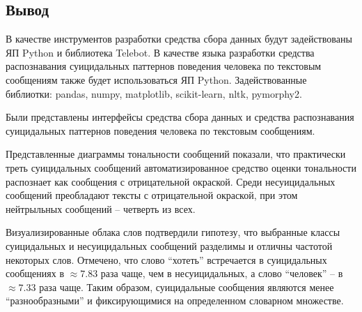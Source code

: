 \subsection*{Вывод}

В качестве инструментов разработки средства сбора данных будут задействованы ЯП Python и библиотека Telebot. 
В качестве языка разработки средства распознавания суицидальных паттернов поведения человека по текстовым сообщениям также будет использоваться ЯП Python. 
Задействованные библиотки: pandas, numpy, matplotlib, scikit-learn, nltk, pymorphy2.

Были представлены интерфейсы средства сбора данных и средства распознавания суицидальных паттернов поведения человека по текстовым сообщениям.

Представленные диаграммы тональности сообщений показали, что практически треть суицидальных сообщений автоматизированное средство оценки тональности распознает как сообщения с отрицательной окраской. 
Среди несуицидальных сообщений преобладают тексты с отрицательной окраской, при этом нейтрыльных сообщений -- четверть из всех.

Визуализированные облака слов подтвердили гипотезу, что выбранные классы суицидальных и несуицидальных сообщений разделимы и отличны частотой некоторых слов. 
Отмечено, что слово ``хотеть'' встречается в суицидальных сообщениях в $\approx 7.83$ раза чаще, чем в несуицидальных, а слово ``человек'' -- в $\approx 7.33$ раза чаще. 
Таким образом, суицидальные сообщения являются менее ``разнообразными'' и фиксирующимися на определенном словарном множестве.
